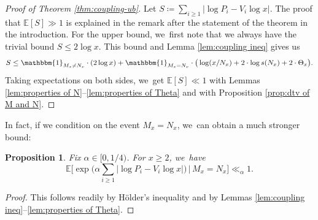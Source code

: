 \documentclass[JEP,XML,SOM,Unicode,published]{cedram}
\newcommand{\EE}{\mathbb{E}}
\newcommand{\one}{\mathbbm{1}}
\newcommand{\bg}{\big}
\newcommand{\bgg}{\Big}
\theoremstyle{plain}
\newtheorem{prop}[cor]{Proposition}
\theoremstyle{definition}
\begin{document}
\begin{proof}[Proof of Theorem \ref{thm:coupling-ub}]
Let $S \coloneqq \sum_{i \ge 1} |{\log P_i - V_i\log x}|$. The proof that $\EE[S] \gg 1$ is explained in the remark after the statement of the theorem in the introduction. For the upper bound, we~first note that we always have the trivial bound $S \le 2 \log x$. This bound and Lemma \ref{lem:coupling ineq} gives us
\[
S \le \one_{M_x \ne N_x}\cdot (2\log x) + \one_{M_x = N_x}\cdot \bg(\log(x/N_x) + 2\cdot \log s(N_x) + 2\cdot \Theta_x\bg).
\]
Taking expectations on both sides, we~get $\EE[S] \ll 1$ with Lemmas \ref{lem:properties of N}--\ref{lem:properties of Theta} and with Proposition \ref{prop:dtv of M and N}.
\end{proof}

In fact, if we condition on the event $M_x = N_x$, we~can obtain a much stronger bound:

\begin{prop}\label{thm:coupling-ub strong}
Fix $\alpha\in[0,1/4)$. For $x\ge2$, we~have
\[\textstyle
\EE\bgg[\exp\bg(\alpha \sum_{i \ge 1} |\log P_i - V_i \log x|\bg) \,\bg|\, M_x = N_x \bgg] \ll_{\alpha} 1.
\]
\end{prop}

\begin{proof}
This follows readily by Hölder's inequality and by Lemmas \ref{lem:coupling ineq}--\ref{lem:properties of Theta}.
\end{proof}

\label{sec:coupling:remarks}
\end{document}
